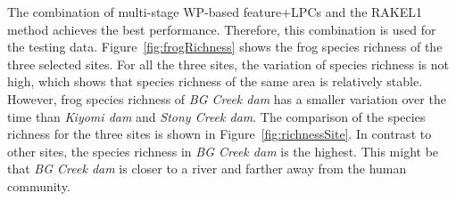The combination of multi-stage WP-based feature+LPCs and the RAKEL1 method achieves the best performance. Therefore, this combination is used for the testing data. 
Figure~\ref{fig:frogRichness} shows the frog species richness of the three selected sites. For all the three sites, the variation of species richness is not high, which shows that species richness of the same area is relatively stable. However, frog species richness of \textit{BG Creek dam} has a smaller variation over the time than \textit{Kiyomi dam} and \textit{Stony Creek dam}. The comparison of the species richness for the three sites is shown in Figure~\ref{fig:richnessSite}. In contrast to other sites, the species richness in \textit{BG Creek dam} is the highest. This might be that \textit{BG Creek dam} is closer to a river and farther away from the human community.


